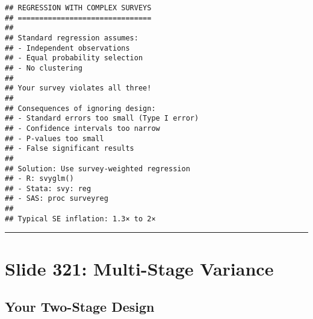 \documentclass[
]{article}
\begin{document}
\begin{verbatim}
## REGRESSION WITH COMPLEX SURVEYS
## ===============================
## 
## Standard regression assumes:
## - Independent observations
## - Equal probability selection
## - No clustering
## 
## Your survey violates all three!
## 
## Consequences of ignoring design:
## - Standard errors too small (Type I error)
## - Confidence intervals too narrow
## - P-values too small
## - False significant results
## 
## Solution: Use survey-weighted regression
## - R: svyglm()
## - Stata: svy: reg
## - SAS: proc surveyreg
## 
## Typical SE inflation: 1.3× to 2×
\end{verbatim}

\begin{center}\rule{0.5\linewidth}{0.5pt}\end{center}

\section{Slide 321: Multi-Stage
Variance}\label{slide-321-multi-stage-variance}

\subsection{Your Two-Stage Design}\label{your-two-stage-design}
\end{document}

